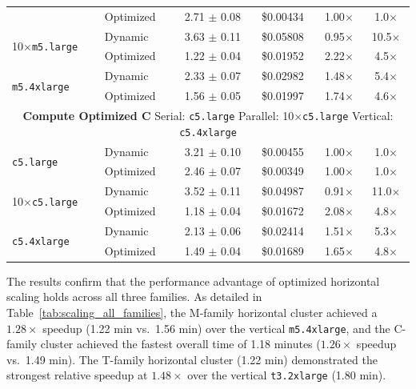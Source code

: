 \documentclass[conference]{IEEEtran}
\begin{document}
\begin{table}[!htbp]
\begin{tabular}{llcccc}
                                         & Optimized & 2.71 $\pm$ 0.08 & \$0.00434 & 1.00$\times$ & 1.0$\times$ \\
\multirow{2}{*}{10$\times$\texttt{m5.large}} & Dynamic   & 3.63 $\pm$ 0.11 & \$0.05808 & 0.95$\times$ & 10.5$\times$ \\
                                         & Optimized & 1.22 $\pm$ 0.04 & \$0.01952 & 2.22$\times$ & 4.5$\times$ \\
\multirow{2}{*}{\texttt{m5.4xlarge}}    & Dynamic   & 2.33 $\pm$ 0.07 & \$0.02982 & 1.48$\times$ & 5.4$\times$ \\
                                         & Optimized & 1.56 $\pm$ 0.05 & \$0.01997 & 1.74$\times$ & 4.6$\times$ \\
\midrule
\multicolumn{6}{c}{\textbf{Compute Optimized C} \quad Serial: \texttt{c5.large} \quad Parallel: 10$\times$\texttt{c5.large} \quad Vertical: \texttt{c5.4xlarge}} \\
\midrule
\multirow{2}{*}{\texttt{c5.large}}      & Dynamic   & 3.21 $\pm$ 0.10 & \$0.00455 & 1.00$\times$ & 1.0$\times$ \\
                                         & Optimized & 2.46 $\pm$ 0.07 & \$0.00349 & 1.00$\times$ & 1.0$\times$ \\
\multirow{2}{*}{10$\times$\texttt{c5.large}} & Dynamic   & 3.52 $\pm$ 0.11 & \$0.04987 & 0.91$\times$ & 11.0$\times$ \\
                                         & Optimized & 1.18 $\pm$ 0.04 & \$0.01672 & 2.08$\times$ & 4.8$\times$ \\
\multirow{2}{*}{\texttt{c5.4xlarge}}    & Dynamic   & 2.13 $\pm$ 0.06 & \$0.02414 & 1.51$\times$ & 5.3$\times$ \\
                                         & Optimized & 1.49 $\pm$ 0.04 & \$0.01689 & 1.65$\times$ & 4.8$\times$ \\
\bottomrule
\end{tabular}
\end{table}

The results confirm that the performance advantage of optimized horizontal
scaling holds across all three families. As detailed in
Table~\ref{tab:scaling_all_families}, the M-family horizontal cluster achieved
a $1.28\times$ speedup (1.22 min vs.\ 1.56 min) over the vertical
\texttt{m5.4xlarge}, and the C-family cluster achieved the fastest overall time
of 1.18 minutes ($1.26\times$ speedup vs.\ 1.49 min). The T-family horizontal
cluster (1.22 min) demonstrated the strongest relative speedup at $1.48\times$
over the vertical \texttt{t3.2xlarge} (1.80 min).
\end{document}
